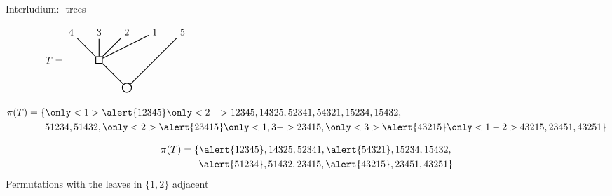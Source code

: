 \begin{frame}{Interludium: \PQ-trees}
\begin{overprint}
$\hspace{4em}T = 
\begin{aligned}
\begin{tikzpicture}

\tikzstyle{every path}+=[thick]

\node (4) {4};
\node[right of=4] (3) {3};
\node[right of=3] (2) {2};
\node[right of=2] (1) {1};
\node[right of=1] (5) {5};

\node[rectangle, draw, below of=3] (t2) {};
\node[circle, draw, below of=t2,right of=t2] (t1) {};

\draw (t2) edge (1);
\draw (t1) edge (5);
\draw (t2) edge (2);
\draw (t2) edge (3);
\draw (t2) edge (4);
\draw (t1) edge (t2);
\end{tikzpicture}
\end{aligned}$
\end{overprint}


\begin{overprint}
\begin{align*}
\pi(T) & = \{\only<1>{\alert{12345}}\only<2->{12345}, 14325, 52341, 54321, 15234, 15432, \\
         & \hspace{1.8em} 51234, 51432, \only<2>{\alert{23415}}\only<1,3->{23415}, \only<3>{\alert{43215}}\only<1-2>{43215}, 23451, 43251\}
\end{align*}

\begin{align*}
\pi(T) & = \{\alert{12345}, 14325, 52341, \alert{54321}, 15234, 15432, \\
         & \hspace{1.8em} \alert{51234}, 51432, 23415, \alert{43215}, 23451, 43251\}
\end{align*}
Permutations with the leaves in $\{1, 2\}$ adjacent
\end{overprint}
\end{frame}


